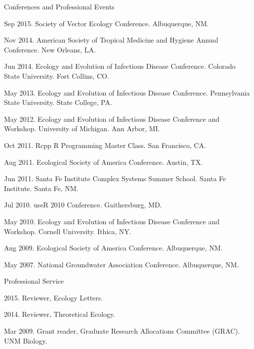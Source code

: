 \documentclass{resume} %
\begin{document}
\clearpage

\begin{rSection}{Conferences and Professional Events}
\item Sep 2015. Society of Vector Ecology Conference.  Albuquerque, NM.
\item Nov 2014. American Society of Tropical Medicine and Hygiene Annual
Conference.  New Orleans, LA.
\item Jun 2014. Ecology and Evolution of Infectious Disease Conference.
Colorado State University.  Fort Collins, CO.
\item May 2013. Ecology and Evolution of Infectious Disease Conference.
Pennsylvania State University.  State College, PA.
\item May 2012. Ecology and Evolution of Infectious Disease Conference
and Workshop.  University of Michigan.  Ann Arbor, MI.
\item Oct 2011. Rcpp R Programming Master Class. San Francisco, CA.
\item Aug 2011. Ecological Society of America Conference. Austin, TX.
\item Jun 2011. Santa Fe Institute Complex Systems Summer School. Santa Fe Institute. Santa Fe, NM. 
\item Jul 2010.  useR 2010 Conference. Gaithersburg, MD. 
\item May 2010. Ecology and Evolution of Infectious Disease Conference
and Workshop.  Cornell University.  Ithica, NY.
\item Aug 2009. Ecological Society of America Conference. Albuquerque, NM.
\item May 2007. National Groundwater Association Conference. Albuquerque, NM. 
\end{rSection}

\begin{rSection}{Professional Service}
\item 2015. Reviewer, Ecology Letters.
\item 2014. Reviewer, Theoretical Ecology.
\item Mar 2009. Grant reader, Graduate Research Allocations Committee (GRAC). UNM Biology.
\end{rSection}
\end{document}
